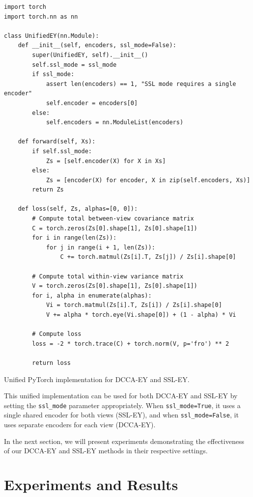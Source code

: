 \begin{listing}[ht]
    \begin{verbatim}
import torch
import torch.nn as nn

class UnifiedEY(nn.Module):
    def __init__(self, encoders, ssl_mode=False):
        super(UnifiedEY, self).__init__()
        self.ssl_mode = ssl_mode
        if ssl_mode:
            assert len(encoders) == 1, "SSL mode requires a single encoder"
            self.encoder = encoders[0]
        else:
            self.encoders = nn.ModuleList(encoders)

    def forward(self, Xs):
        if self.ssl_mode:
            Zs = [self.encoder(X) for X in Xs]
        else:
            Zs = [encoder(X) for encoder, X in zip(self.encoders, Xs)]
        return Zs

    def loss(self, Zs, alphas=[0, 0]):
        # Compute total between-view covariance matrix
        C = torch.zeros(Zs[0].shape[1], Zs[0].shape[1])
        for i in range(len(Zs)):
            for j in range(i + 1, len(Zs)):
                C += torch.matmul(Zs[i].T, Zs[j]) / Zs[i].shape[0]
        
        # Compute total within-view variance matrix
        V = torch.zeros(Zs[0].shape[1], Zs[0].shape[1])
        for i, alpha in enumerate(alphas):
            Vi = torch.matmul(Zs[i].T, Zs[i]) / Zs[i].shape[0]
            V += alpha * torch.eye(Vi.shape[0]) + (1 - alpha) * Vi
        
        # Compute loss
        loss = -2 * torch.trace(C) + torch.norm(V, p='fro') ** 2
        
        return loss
    \end{verbatim}
    \caption{Unified PyTorch implementation for DCCA-EY and SSL-EY.}
    \label{lst:pytorch-unified}
\end{listing}

This unified implementation can be used for both DCCA-EY and SSL-EY by setting the \texttt{ssl\_mode} parameter appropriately. When \texttt{ssl\_mode=True}, it uses a single shared encoder for both views (SSL-EY), and when \texttt{ssl\_mode=False}, it uses separate encoders for each view (DCCA-EY).

In the next section, we will present experiments demonstrating the effectiveness of our DCCA-EY and SSL-EY methods in their respective settings.

\section{Experiments and Results}

